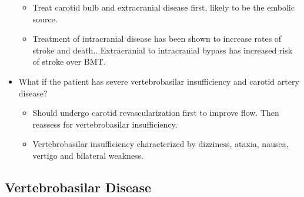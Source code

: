 \documentclass[
]{book}
\providecommand{\tightlist}{%
  \setlength{\itemsep}{0pt}\setlength{\parskip}{0pt}}
\begin{document}
\begin{itemize}
  \begin{itemize}
  \tightlist
  \item
    Treat carotid bulb and extracranial disease first, likely to be
    the embolic source.
  \item
    Treatment of intracranial disease has been shown to increase
    rates of stroke and death.\citep{chimowitz2011}. Extracranial to
    intracranial bypass has increased risk of stroke over
    BMT.\citep{ec/icbypassstudygroup1985}
  \end{itemize}
\item
  What if the patient has severe vertebrobasilar insufficiency and
  carotid artery disease?

  \begin{itemize}
  \tightlist
  \item
    Should undergo carotid revascularization first to improve flow.
    Then reassess for vertebrobasilar insufficiency.
  \item
    Vertebrobasilar insufficiency characterized by dizziness,
    ataxia, nausea, vertigo and bilateral weakness.
    \citep{limanetoPathophysiologyDiagnosisVertebrobasilar2017, nouh2014}
  \end{itemize}
\end{itemize}

\hypertarget{vertebrobasilar-disease}{%
\subsection{Vertebrobasilar Disease}\label{vertebrobasilar-disease}}
\end{document}
